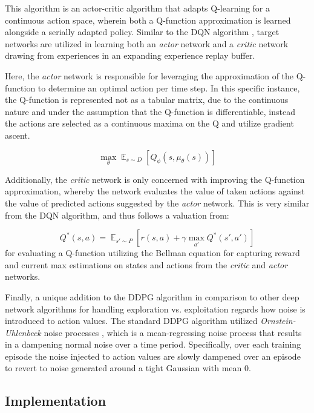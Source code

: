 \documentclass[11pt]{article}
\begin{document}
This algorithm is an actor-critic algorithm that adapts Q-learning for a continuous action space, wherein both a Q-function approximation is learned alongside a serially adapted policy. Similar to the DQN algorithm \cite{dqn}, target networks are utilized in learning both an \textit{actor} network and a \textit{critic} network drawing from experiences in an expanding experience replay buffer.

Here, the \textit{actor} network is responsible for leveraging the approximation of the Q-function to determine an optimal action per time step. In this specific instance, the Q-function is represented not as a tabular matrix, due to the continuous nature and under the assumption that the Q-function is differentiable, instead the actions are selected as a continuous maxima on the Q and utilize gradient ascent.

\begin{equation}
	\mathop{\mathbb{\text{max}}}_\theta\mathop{\mathbb{E}}_{s\sim D}\left[Q_{\phi}\left(s, \mu_{\theta}(s)\right)\right]
\end{equation}

Additionally, the \textit{critic} network is only concerned with improving the Q-function approximation, whereby the network evaluates the value of taken actions against the value of predicted actions suggested by the \textit{actor} network. This is very similar from the DQN algorithm, and thus follows a valuation from:

\begin{equation}
	Q^*(s, a) = \mathop{\mathbb{E}}_{s' \sim P}\left[r(s, a) + \gamma\mathop{\mathbb{\text{max}}}_{a'}Q^*(s', a')\right]
\end{equation}
for evaluating a Q-function utilizing the Bellman equation for capturing reward and current max estimations on states and actions from the \textit{critic} and \textit{actor} networks.

Finally, a unique addition to the DDPG algorithm in comparison to other deep network algorithms for handling exploration vs. exploitation regards how noise is introduced to action values. The standard DDPG algorithm utilized \textit{Ornstein-Uhlenbeck} noise processes \cite{ddpg}, which is a mean-regressing noise process that results in a dampening normal noise over a time period. Specifically, over each training episode the noise injected to action values are slowly dampened over an episode to revert to noise generated around a tight Gaussian with mean 0.

\subsection{Implementation}
\end{document}
